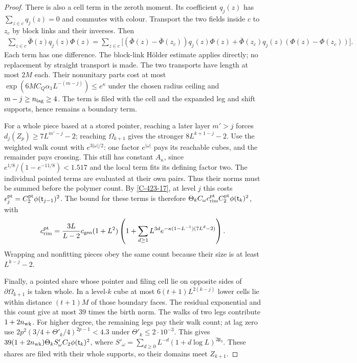 \documentclass[11pt,letterpaper,reqno]{amsart}
\theoremstyle{definition}
\theoremstyle{remark}
\begin{document}
\begin{proof}
There is also a cell term in the zeroth
moment. Its coefficient $q_j(z)$ has
$\sum_{z\in c}q_j(z)=0$ and commutes with
colour. Transport the two fields inside
$c$ to $z_c$ by block links and their
inverses. Then
\[
\begin{split}
 \sum_{z\in c}\bar\Phi(z)q_j(z)\Phi(z)
 =\sum_{z\in c}\big[
  (\bar\Phi(z)-\bar\Phi(z_c))q_j(z)\Phi(z)
 +\bar\Phi(z_c)q_j(z)(\Phi(z)-\Phi(z_c))\big].
\end{split}
\]
Each term has one difference. The block-link
H\"older estimate applies directly; no
replacement by straight transport is made.
The two transports have length at most
$2M$ each. Their nonunitary parts cost
at most $\exp(6MC_Q\alpha_1L^{-(m-j)})
\le e^\kappa$ under the chosen radius
ceiling and $m-j\ge n_{\rm lag}\ge4$.
The term is filed with the cell and the
expanded leg and shift supports, hence
remains a boundary term.

For a whole piece based at a stored pointer,
reaching a later layer $m'>j$ forces
$d_j(Z_p)\ge7L^{m'-j}-2$; reaching
$\Omega_{k+1}$ gives the stronger
$8L^{k+1-j}-2$. Use the weighted walk
count with $e^{3|\omega|/2}$: one factor
$e^{|\omega|}$ pays its reachable cubes,
and the remainder pays crossing. This
still has constant $A_\kappa$, since
$e^{1/8}/(1-e^{-11/8})<1.517$ and the
local term fits its defining factor two.
The individual pointed terms are evaluated at their own pairs.
Thus their norms must be summed before the polymer count.
By \cref{C-423-17}, at level $j$ this costs
$\epsilon_j^{\rm pt}=C_2^{\rm pt}\phi(\mathsf t_{j-1})^2$.
The bound for these terms is therefore
$\Theta_k C_\omega c_{\rm rim}^{\rm pt}
C_2^{\rm pt}\phi(\mathsf t_k)^2$, with
\[
 c_{\rm rim}^{\rm pt}=
 \frac{3L}{L-2}c_{\rm geo}(1+L^2)
 \left(1+\sum_{d\ge1}L^{3d}
                 e^{-\kappa(1-L^{-1})(7L^d-2)}\right).
\]
Wrapping and nonfitting pieces obey the same
count because their size is at least
$L^{k-j}-2$.

Finally, a pointed share whose pointer and
filing cell lie on opposite sides of
$\partial\Omega_{k+1}$ is taken whole.
In a level-$k$ cube at most
$6(t+1)L^{2(k-j)}$ lower cells lie within
distance $(t+1)M$ of those boundary faces.
The residual exponential and this count
give at most $39$ times the birth norm.
The walks of two legs contribute
$1+2n_{\rm wk}$. For higher degree, the
remaining legs pay their walk count;
at lag zero use
$2p^2(3/4+\Theta'_k/4)^{2p-1}<4.3$
under $\Theta'_k\le2\cdot10^{-3}$.
This gives
$39(1+2n_{\rm wk})\Theta_k S'_\omega
C_2\phi(\mathsf t_k)^2$, where
$S'_\omega=\sum_{d\ge0}L^{-d}(1+d\log L)^{2\mathfrak p_0}$.
These shares are filed with their whole supports,
so their domains meet $Z_{k+1}$.


\end{proof}
\end{document}
